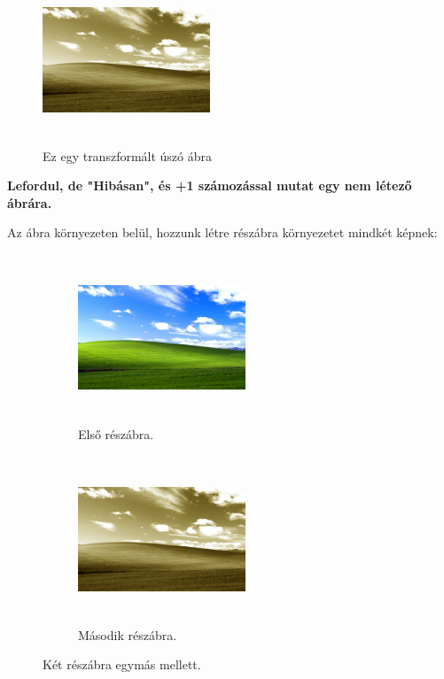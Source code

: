 \documentclass{article}
\begin{document}
\begin{figure}[htbp]
	\centering
	\includegraphics[width=5cm, height=5cm, angle=180, keepaspectratio]{szepia.jpg}
	\caption{Ez egy transzformált úszó ábra}
\end{figure}

\textbf{Lefordul, de "Hibásan", és +1 számozással mutat egy nem létező ábrára.}

Az ábra környezeten belül, hozzunk létre részábra környezetet mindkét képnek:\\
\begin{figure}
	\centering
	\begin{subfigure}[b]{0.45\textwidth}
		\includegraphics[width=5cm, height=5cm, keepaspectratio]{szines.jpg}
		\caption{Első részábra.}
	\end{subfigure}
	\hfill
	\begin{subfigure}[b]{0.45\textwidth}
		\includegraphics[width=5cm, height=5cm, keepaspectratio]{szepia.jpg}
		\caption{Második részábra.}
	\end{subfigure}
	\vfill
	\caption{Két részábra egymás mellett.}
\end{figure}
\end{document}
